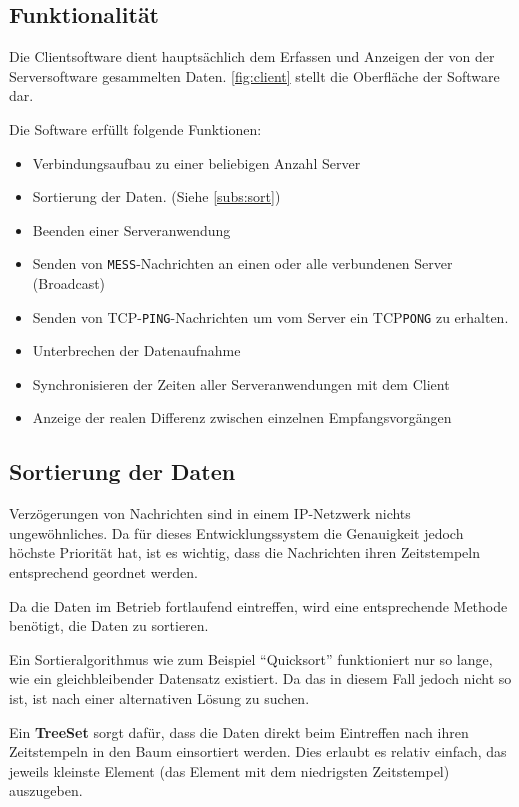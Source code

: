 \subsection{Funktionalität}
Die Clientsoftware dient hauptsächlich dem Erfassen und Anzeigen der von der
Serversoftware gesammelten Daten. \autoref{fig:client} stellt die Oberfläche der
Software dar.

Die Software erfüllt folgende Funktionen:
\begin{itemize}
  \item Verbindungsaufbau zu einer beliebigen Anzahl Server
  \item Sortierung der Daten. (Siehe \autoref{subs:sort})
  \item Beenden einer Serveranwendung
  \item Senden von \texttt{MESS}-Nachrichten an einen oder alle
  verbundenen Server (Broadcast)
  \item Senden von TCP-\texttt{PING}-Nachrichten um vom Server ein
  TCP\texttt{PONG} zu erhalten.
  \item Unterbrechen der Datenaufnahme
  \item Synchronisieren der Zeiten aller Serveranwendungen mit dem Client
  \item Anzeige der realen Differenz zwischen einzelnen Empfangsvorgängen
\end{itemize}
\subsection{Sortierung der Daten}\label{subs:sort}
Verzögerungen von Nachrichten sind in einem IP-Netzwerk nichts ungewöhnliches.
Da für dieses Entwicklungssystem die Genauigkeit jedoch höchste Priorität hat,
ist es wichtig, dass die Nachrichten ihren Zeitstempeln entsprechend geordnet
werden.

Da die Daten im Betrieb fortlaufend eintreffen, wird eine entsprechende Methode
benötigt, die Daten zu sortieren.

Ein Sortieralgorithmus wie zum Beispiel "`Quicksort"' funktioniert nur so lange,
wie ein gleichbleibender Datensatz existiert. Da das in diesem Fall jedoch
nicht so ist, ist nach einer alternativen Lösung zu suchen.

Ein \textbf{TreeSet} sorgt dafür, dass die Daten direkt beim Eintreffen nach
ihren Zeitstempeln in den Baum einsortiert werden. Dies erlaubt es relativ
einfach, das jeweils kleinste Element (das Element mit dem niedrigsten
Zeitstempel) auszugeben. 


